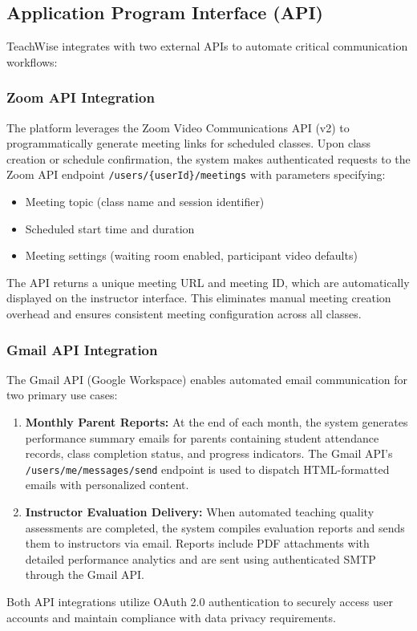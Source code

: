 \subsection{Application Program Interface (API)}
TeachWise integrates with two external APIs to automate critical communication workflows:

\subsubsection*{Zoom API Integration}
The platform leverages the Zoom Video Communications API (v2) to programmatically generate meeting links for scheduled classes. Upon class creation or schedule confirmation, the system makes authenticated requests to the Zoom API endpoint \texttt{/users/\{userId\}/meetings} with parameters specifying:
\begin{itemize}
    \item Meeting topic (class name and session identifier)
    \item Scheduled start time and duration
    \item Meeting settings (waiting room enabled, participant video defaults)
\end{itemize}
The API returns a unique meeting URL and meeting ID, which are automatically displayed on the instructor interface. This eliminates manual meeting creation overhead and ensures consistent meeting configuration across all classes.

\subsubsection*{Gmail API Integration}
The Gmail API (Google Workspace) enables automated email communication for two primary use cases:
\begin{enumerate}
    \item \textbf{Monthly Parent Reports:} At the end of each month, the system generates performance summary emails for parents containing student attendance records, class completion status, and progress indicators. The Gmail API's \texttt{/users/me/messages/send} endpoint is used to dispatch HTML-formatted emails with personalized content.
    \item \textbf{Instructor Evaluation Delivery:} When automated teaching quality assessments are completed, the system compiles evaluation reports and sends them to instructors via email. Reports include PDF attachments with detailed performance analytics and are sent using authenticated SMTP through the Gmail API.
\end{enumerate}
Both API integrations utilize OAuth 2.0 authentication to securely access user accounts and maintain compliance with data privacy requirements.


